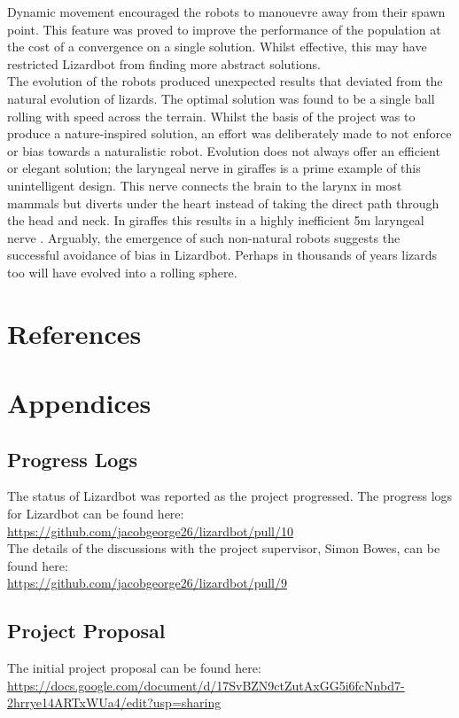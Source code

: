 \documentclass{article}
\begin{document}
Dynamic movement encouraged the robots to manouevre away from their spawn point. This feature was proved to improve the performance of the population at the cost of a convergence on a single solution. Whilst effective, this may have restricted Lizardbot from finding more abstract solutions. \\

The evolution of the robots produced unexpected results that deviated from the natural evolution of lizards. The optimal solution was found to be a single ball rolling with speed across the terrain. Whilst the basis of the project was to produce a nature-inspired solution, an effort was deliberately made to not enforce or bias towards a naturalistic robot. Evolution does not always offer an efficient or elegant solution; the laryngeal nerve in giraffes is a prime example of this unintelligent design. This nerve connects the brain to the larynx in most mammals but diverts under the heart instead of taking the direct path through the head and neck. In giraffes this results in a highly inefficient 5m laryngeal nerve . Arguably, the emergence of such non-natural robots suggests the successful avoidance of bias in Lizardbot. Perhaps in thousands of years lizards too will have evolved into a rolling sphere. 

\newpage

\section{References}
\label{sec:References}

\newpage


\section{Appendices}
\subsection{Progress Logs}
The status of Lizardbot was reported as the project progressed.
The progress logs for Lizardbot can be found here:\\
\url{https://github.com/jacobgeorge26/lizardbot/pull/10}\\

\noindent The details of the discussions with the project supervisor, Simon Bowes, can be found here:\\
\url{https://github.com/jacobgeorge26/lizardbot/pull/9}


\subsection{Project Proposal}
The initial project proposal can be found here:\\
\url{https://docs.google.com/document/d/17SvBZN9ctZutAxGG5i6fcNnbd7-2hrrye14ARTxWUa4/edit?usp=sharing}
\end{document}
